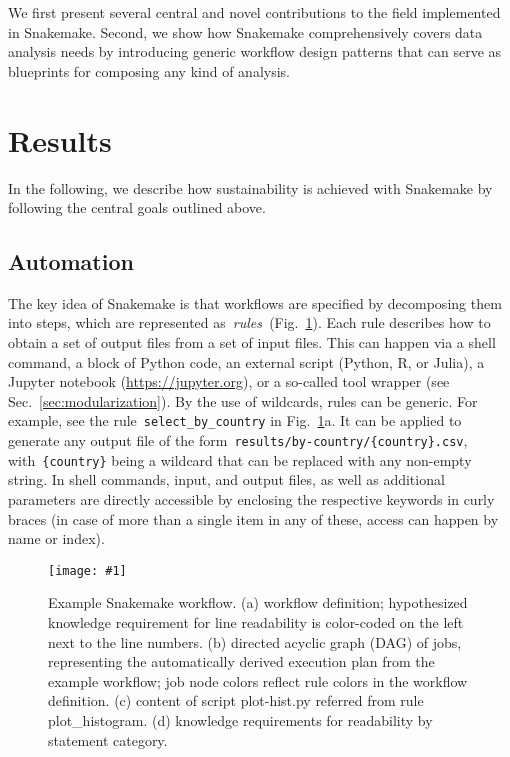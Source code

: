 \documentclass[parskip=half]{scrartcl}
\newcommand{\image}[1]{\centering\texttt{[image: \#1]}}
\let\plainurl\url
\renewcommand{\url}[1]{\protect\plainurl{#1}}
\begin{document}
We first present several central and novel contributions to the field implemented in Snakemake.
Second, we show how Snakemake comprehensively covers data analysis needs by introducing generic workflow design patterns that can serve as blueprints for composing any kind of analysis.

\section{Results}

In the following, we describe how sustainability is achieved with Snakemake by following the central goals outlined above.

\subsection{Automation}

The key idea of Snakemake is that workflows are specified by decomposing them into steps, which are represented as~\emph{rules~}(Fig.~\ref{fig:example}).
Each rule describes how to obtain a set of output files from a set of input files.
This can happen via a shell command, a block of Python code, an external script (Python, R, or Julia), a Jupyter notebook (\url{https://jupyter.org}), or a so-called tool wrapper (see Sec.~\ref{sec:modularization}).
By the use of wildcards, rules can be generic.
For example, see the rule~\lstinline!select_by_country! in Fig.~\ref{fig:example}a.
It can be applied to generate any output file of the form~\lstinline!results/by-country/{country}.csv!, with~\lstinline!{country}! being a wildcard that can be replaced with any non-empty string.
In shell commands, input, and output files, as well as additional parameters are directly accessible by enclosing the respective keywords in curly braces (in case of more than a single item in any of these, access can happen by name or index).

\begin{figure}
	\image{example-workflow.pdf}
	\caption{
		Example Snakemake workflow. (a) workflow definition; hypothesized knowledge requirement for line readability is color-coded on the left next to the line numbers. (b) directed acyclic graph (DAG) of jobs, representing the automatically derived execution plan from the example workflow; job node colors reflect rule colors in the workflow definition. (c) content of script plot-hist.py referred from rule plot\_histogram. (d) knowledge requirements for readability by statement category.
	}
	\label{fig:example}
\end{figure}
\end{document}
